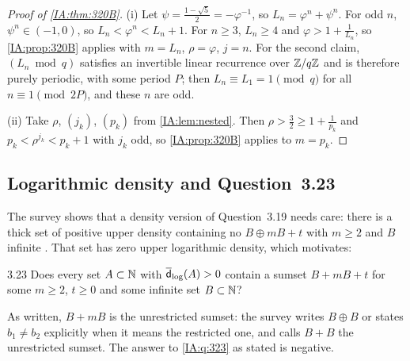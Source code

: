 \begin{proof}[Proof of \cref{IA:thm:320B}]
(i) Let $\psi=\frac{1-\sqrt5}2=-\varphi^{-1}$, so $L_n=\varphi^n+\psi^n$. For odd $n$,
$\psi^n\in(-1,0)$, so $L_n<\varphi^n<L_n+1$. For $n\ge3$, $L_n\ge4$ and $\varphi>1+\frac1{L_n}$, so
\cref{IA:prop:320B} applies with $m=L_n$, $\rho=\varphi$, $j=n$. For the second claim, $(L_n\bmod q)$
satisfies an invertible linear recurrence over $\mathbb{Z}/q\mathbb{Z}$ and is therefore purely periodic, with some
period $P$; then $L_n\equiv L_1=1\pmod q$ for all $n\equiv1\pmod{2P}$, and these $n$ are odd.

(ii) Take $\rho$, $(j_k)$, $(p_k)$ from \cref{IA:lem:nested}. Then $\rho>\frac32\ge1+\frac1{p_k}$ and
$p_k<\rho^{j_k}<p_k+1$ with $j_k$ odd, so \cref{IA:prop:320B} applies to $m=p_k$.
\end{proof}



\subsection{Logarithmic density and Question~3.23}\label{IA:sec:q323}
The survey shows that a density version of Question~3.19 needs care: there is a thick set of positive
upper density containing no $B\oplus mB+t$ with $m\ge2$ and $B$ infinite
\cite[Example~3.21]{kra2023problems}. That set has zero upper logarithmic density, which motivates:

\begin{question}{3.23}\label{IA:q:323}
Does every set $A\subset\mathbb{N}$ with $\overline{\mathsf{d}}_{\log}(A)>0$ contain a sumset $B+mB+t$ for some $m\ge2$, $t\ge0$
and some infinite set $B\subset\mathbb{N}$?
\end{question}

As written, $B+mB$ is the unrestricted sumset: the survey writes $B\oplus B$ or states $b_1\ne b_2$
explicitly when it means the restricted one, and calls $B+B$ the unrestricted sumset. The answer to
\cref{IA:q:323} as stated is negative.

